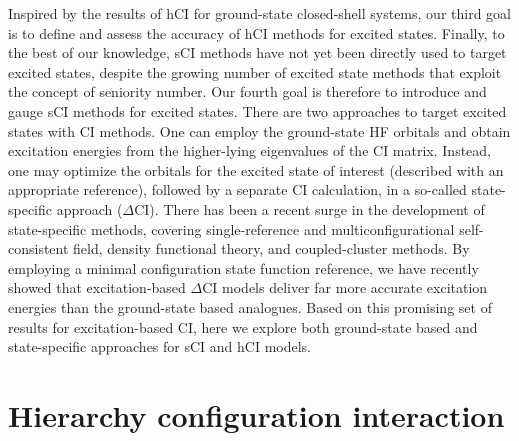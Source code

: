 \documentclass[aip,jcp,reprint,noshowkeys,superscriptaddress]{revtex4-1}
\begin{document}
Inspired by the results of hCI for ground-state closed-shell systems, \cite{Kossoski_2022} our third goal is to define and assess the accuracy of hCI methods for excited states.
Finally, to the best of our knowledge, sCI methods have not yet been directly used to target excited states,
despite the growing number of excited state methods that exploit the concept of seniority number. \cite{} 
Our fourth goal is therefore to introduce and gauge sCI methods for excited states.
There are two approaches to target excited states with CI methods.
One can employ the ground-state HF orbitals and obtain excitation energies from the higher-lying eigenvalues of the CI matrix.
Instead, one may optimize the orbitals for the excited state of interest (described with an appropriate reference), followed by a separate CI calculation,
in a so-called state-specific approach ($\Delta$CI).
There has been a recent surge in the development of state-specific methods, covering 
single-reference and multiconfigurational self-consistent field,
\cite{Ziegler_1977,Burton_2021,Shea_2018,Tran_2019,Tran_2020,Hardikar_2020,Burton_2022,Hanscam_2022,Kossoski_2023,Marie_2023}
density functional theory, 
\cite{Filatov_1999,Kowalczyk_2011,Kowalczyk_2013,Gilbert_2008,Barca_2018,Hait_2020,Hait_2021,Hardikar_2020,Zhao_2020,Levi_2020,Carter-Fenk_2020,Toffoli_2022,Schmerwitz_2022}
and coupled-cluster 
\cite{Piecuch_2000,Mayhall_2010,Lee_2019,Kossoski_2021,Marie_2021,Rishi_2023}
methods.
By employing a minimal configuration state function reference, we have recently showed that excitation-based $\Delta$CI models deliver far more accurate excitation energies than the ground-state based analogues. \cite{Kossoski_2023}
Based on this promising set of results for excitation-based CI, here we explore both ground-state based and state-specific approaches for sCI and hCI models.



\section{Hierarchy configuration interaction}
\label{sec:hCI}
\end{document}

